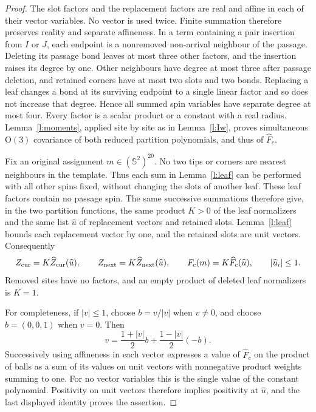 \begin{proof}
The slot factors and the replacement factors are real and affine
in each of their vector variables.  No vector is used twice.
Finite summation therefore preserves reality and separate
affineness.  In a term containing a pair insertion from \(I\) or
\(J\), each endpoint is a nonremoved non-arrival neighbour of the
passage.  Deleting its passage bond leaves at most three other
factors, and the insertion raises its degree by one.  Other
neighbours have degree at most three after passage deletion, and
retained corners have at most two slots and two bonds.  Replacing
a leaf changes a bond at its surviving endpoint to a single
linear factor and so does not increase that degree.  Hence all
summed spin variables have separate degree at most four.
Every factor is a scalar product or a constant with a real
radius.  Lemma~\ref{l:moments}, applied site by site as in
Lemma~\ref{l:Iw}, proves simultaneous \(\mathrm O(3)\) covariance
of both reduced partition polynomials, and thus of
\(\widehat F_c\).

Fix an original assignment \(m\in(\mathbb S^2)^{20}\).  No two
tips or corners are nearest neighbours in the template.  Thus
each sum in Lemma~\ref{l:leaf} can be performed with all other
spins fixed, without changing the slots of another leaf.  These
leaf factors contain no passage spin.  The same successive
summations therefore give, in the two partition functions, the
same product \(K>0\) of the leaf normalizers and the same list
\(\widehat u\) of replacement vectors and retained slots.
Lemma~\ref{l:leaf} bounds each replacement vector by one, and
the retained slots are unit vectors.  Consequently
\[
 Z_{\rm cur}=K\widehat Z_{\rm cur}(\widehat u),\qquad
 Z_{\rm next}=K\widehat Z_{\rm next}(\widehat u),\qquad
 F_c(m)=K\widehat F_c(\widehat u),\qquad |\widehat u_i|\le1.
\]
Removed sites have no factors, and an empty product of deleted
leaf normalizers is \(K=1\).

For completeness, if \(|v|\le1\), choose \(b=v/|v|\) when
\(v\ne0\), and choose \(b=(0,0,1)\) when \(v=0\).  Then
\[
 v=\frac{1+|v|}{2}b+\frac{1-|v|}{2}(-b).
\]
Successively using affineness in each vector expresses a value
of \(\widehat F_c\) on the product of balls as a sum of its
values on unit vectors with nonnegative product weights summing
to one.  For no vector variables this is the single value of the
constant polynomial.  Positivity on unit vectors therefore
implies positivity at \(\widehat u\), and the last displayed
identity proves the assertion.
\end{proof}

